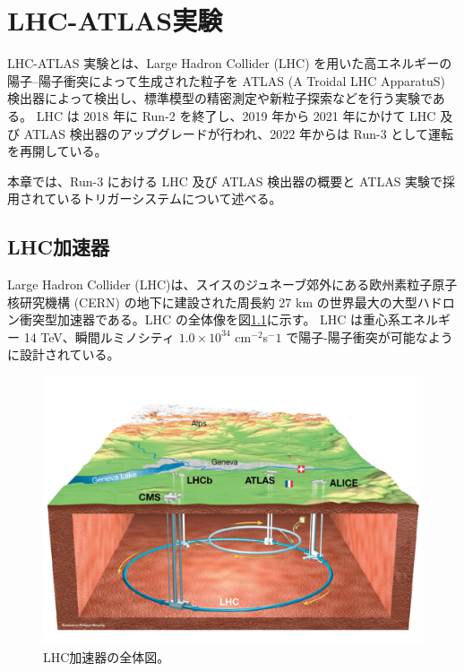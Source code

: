 \chapter{LHC-ATLAS実験}
\label{chapter2}

LHC-ATLAS 実験とは、Large Hadron Collider (LHC) を用いた高エネルギーの陽子–陽子衝突によって生成された粒子を ATLAS (A Troidal LHC ApparatuS) 検出器によって検出し、標準模型の精密測定や新粒子探索などを行う実験である。
LHC は 2018 年に Run-2 を終了し、2019 年から 2021 年にかけて LHC 及び ATLAS 検出器のアップグレードが行われ、2022 年からは Run-3 として運転を再開している。

本章では、Run-3 における LHC 及び ATLAS 検出器の概要と ATLAS 実験で採用されているトリガーシステムについて述べる。

\section{LHC加速器}
\label{section2-1}
Large Hadron Collider (LHC)は、スイスのジュネーブ郊外にある欧州素粒子原子核研究機構 (CERN) の地下に建設された周長約 27 km の世界最大の大型ハドロン衝突型加速器である。LHC の全体像を図\ref{fig:LHC_overview}に示す。
LHC は重心系エネルギー 14 TeV、瞬間ルミノシティ $1.0\times10^{34}$ cm$^{-2}$s${^-1}$ で陽子-陽子衝突が可能なように設計されている。

\begin{figure}[tb]
  \centering
  \includegraphics[clip, width=14cm]{fig/2/LHC_overview.pdf}
  \caption{LHC加速器の全体図。}
  \label{fig:LHC_overview}
\end{figure}

